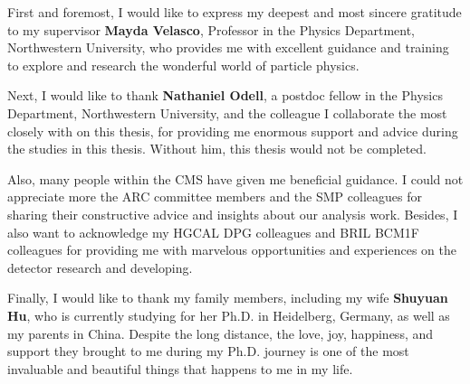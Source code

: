 \acknowledgements

First and foremost, I would like to express my deepest and most sincere gratitude to my supervisor \textbf{Mayda Velasco}, Professor in the Physics Department, Northwestern University, who provides me with excellent guidance and training to explore and research the wonderful world of particle physics. 

Next, I would like to thank \textbf{Nathaniel Odell}, a postdoc fellow in the Physics Department, Northwestern University, and the colleague I collaborate the most closely with on this thesis, for providing me enormous support and advice during the studies in this thesis. Without him, this thesis would not be completed. 

Also, many people within the CMS have given me beneficial guidance. I could not appreciate more the ARC committee members and the SMP colleagues for sharing their constructive advice and insights about our analysis work. Besides, I also want to acknowledge my HGCAL DPG colleagues and BRIL BCM1F colleagues for providing me with marvelous opportunities and experiences on the detector research and developing.

Finally, I would like to thank my family members, including my wife \textbf{Shuyuan Hu}, who is currently studying for her Ph.D. in Heidelberg, Germany, as well as my parents in China. Despite the long distance, the love, joy, happiness, and support they brought to me during my Ph.D. journey is one of the most invaluable and beautiful things that happens to me in my life.